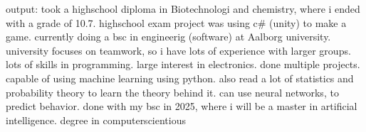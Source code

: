 output: took a highschool diploma in Biotechnologi and chemistry, where i ended with a grade of 10.7.
highschool exam project was using c# (unity) to make a game.
currently doing a bsc in engineerig (software) at Aalborg university.
university focuses on teamwork, so i have lots of experience with larger groups.
lots of skills in programming.
large interest in electronics. done multiple projects.
capable of using machine learning using python. also read a lot of statistics and probability theory to learn the theory behind it. can use neural networks, to predict behavior.
done with my bsc in 2025, where i will be a master in artificial intelligence.
degree in computerscientious


